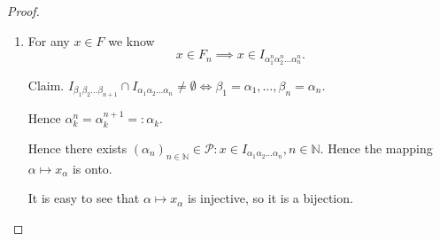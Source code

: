 \begin{proof}
\begin{enumerate}
\item 
	For any $x \in F$ we know \[
	x \in F_n \implies x \in I_{\alpha_1^n \alpha_2^n \ldots \alpha_n^n}
	.\] 

	Claim. $I_{\beta_1\beta_2 \ldots \beta_{n+1}} \cap I_{\alpha_1\alpha_2 \ldots \alpha_n} \neq \emptyset \iff \beta_1=\alpha_1, \ldots, \beta_n = \alpha_n$.

	Hence $\alpha_k^n = \alpha_k^{n+1} =: \alpha_k$.

	Hence there exists $(\alpha_n)_{n\in \mathbb{N}} \in \mathcal{P}: x \in I_{\alpha_1\alpha_2 \ldots \alpha_n}, n \in \mathbb{N}$. Hence the mapping $\alpha \mapsto x_\alpha$ is onto. 

	It is easy to see that $\alpha \mapsto x_\alpha$ is injective, so it is a bijection.
\end{enumerate}
\end{proof}


